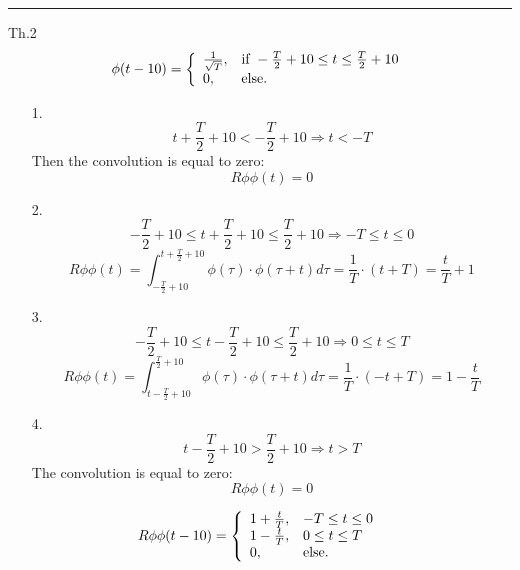 \documentclass[12pt, a4paper]{article}
\begin{document}
\noindent\rule{\textwidth}{0.5pt}
Th.2
\[
\phi(t - 10) = \left\{
\begin{array}{ll} 
\frac{1}{\sqrt{T}}, & \mbox{if}~ -\frac{T}{2 }+ 10 \le t \le \frac{T}{2} + 10\cr
0, & \mbox{else.}
\end{array} \right.
\]
\begin{enumerate}
\item[1.]
\[t +\frac{T}{2} + 10 < -\frac{T}{2} + 10 \Rightarrow t < -T\]
Then the convolution is equal to zero: \[R\phi\phi(t) = 0\]
\item[2.]
\[-\frac{T}{2} + 10 \le t + \frac{T}{2} + 10 \le \frac{T}{2} + 10 \Rightarrow -T \le t \le 0\]
\[R\phi\phi(t) = \int_{-\frac{T}{2} + 10}^{t + \frac{T}{2} + 10} \phi(\tau) \cdot \phi(\tau + t)d\tau
=  \frac{1}{T} \cdot (t + T) = \boxed{\frac{t}{T} + 1}
\]
\item[3.]
\[-\frac{T}{2} + 10 \le t - \frac{T}{2} + 10 \le \frac{T}{2} + 10 \Rightarrow 0 \le t \le T\]
\[R\phi\phi(t) = \int_{t-\frac{T}{2} + 10}^{\frac{T}{2} + 10} \phi(\tau) \cdot \phi(\tau + t)d\tau
= \frac{1}{T} \cdot (-t+T) = \boxed{1 - \frac{t}{T}}
\]
\item[4.]
\[t - \frac{T}{2} + 10  > \frac{T}{2} + 10 \Rightarrow t > T\]
The convolution is equal to zero:\[R\phi\phi(t) = 0\]
\end{enumerate}

\[
R\phi\phi(t - 10) = \left\{
\begin{array}{ll} 
1 + \frac{t}{T}, & -T \le t \le 0 \cr
1 - \frac{t}{T}, & 0\le t \le T\cr
0, & \mbox{else.}
\end{array} \right.
\]
\end{document}
